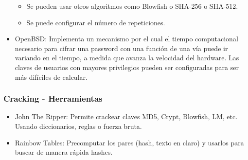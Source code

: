 \begin{itemize}
\begin{itemize}
		\item Se pueden usar otros algoritmos como Blowfish o SHA-256 o SHA-512.
		\item Se puede configurar el número de repeticiones.
	\end{itemize}
	\item OpenBSD: Implementa un mecanismo por el cual el tiempo computacional necesario para cifrar una password 
	con una función de una vía puede ir variando en el tiempo, a medida que avanza la velocidad del hardware. 
	Las claves de usuarios con mayores privilegios pueden ser configuradas para ser más  difíciles de calcular.
\end{itemize}

\subsubsection{Cracking - Herramientas}

\begin{itemize}
	\item John The Ripper: Permite crackear claves MD5, Crypt, Blowfish, LM, etc. Usando diccionarios, reglas o
	fuerza bruta.
	\item Rainbow Tables: Precomputar los pares (hash, texto en claro) y usarlos para buscar de manera rápida hashes.
\end{itemize}
